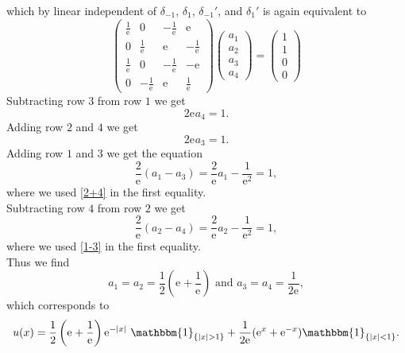 \documentclass[a4paper,11pt]{article}
\newcommand{\euler}[1]{\text{e}^{#1}}
\newcommand{\abs}[1]{\left\lvert #1 \right\rvert}
\numberwithin{equation}{section}
\begin{document}
which by linear independent of $ \delta_{-1} $, $ \delta_{1} $, $ \delta_{-1}' $, and $ \delta_1' $ is again equivalent to \begin{equation}
\begin{pmatrix}
\frac{1}{\euler{}}&0&-\frac{1}{\euler{}}&\euler{}\\
0&\frac{1}{\euler{}}&\euler{}&-\frac{1}{\euler{}}\\
\frac{1}{\euler{}}&0&-\frac{1}{\euler{}}&-\euler{}\\
0&-\frac{1}{\euler{}}&\euler{}&\frac{1}{\euler{}}
\end{pmatrix}
\begin{pmatrix}
a_1\\a_2\\a_3\\a_4
\end{pmatrix}=\begin{pmatrix}
1\\1\\0\\0
\end{pmatrix}
\end{equation}
Subtracting row $ 3 $ from row $ 1 $ we get \begin{equation}\label{1-3}
2\euler{}a_4=1.
\end{equation}
Adding row $ 2 $ and $ 4 $ we get \begin{equation}\label{2+4}
2\euler{}a_3=1.
\end{equation}
Adding row $ 1 $ and $ 3 $ we get the equation \begin{equation}
\frac{2}{\euler{}}(a_1-a_3)=\frac{2}{\euler{}}a_1-\frac{1}{\euler{2}}=1,
\end{equation}
where we used \eqref{2+4} in the first equality.\\
Subtracting row $ 4 $ from row $ 2 $ we get\begin{equation}
\frac{2}{\euler{}}(a_2-a_4)=\frac{2}{\euler{}}a_2-\frac{1}{\euler{2}}=1,
\end{equation}
where we used \eqref{1-3} in the first equality.\\
Thus we find \begin{equation}
a_1=a_2=\frac{1}{2}\left(\euler{}+\frac{1}{\euler{}}\right)\text{  and  } a_3=a_4=\frac{1}{2\euler{}},
\end{equation}
which corresponds to \begin{equation}
u(x)=\frac{1}{2}\left(\euler{}+\frac{1}{\euler{}}\right)\euler{-\abs{x}}\ \mathbbm{1}_{\{\abs{x}>1\}}+\frac{1}{2\euler{}}(\euler{x}+\euler{-x})\mathbbm{1}_{\{\abs{x}<1\}}.
\end{equation}
\end{document}
